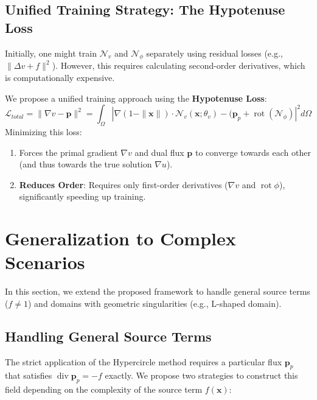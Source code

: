 \documentclass[12pt, a4paper]{article}
\DeclareMathOperator{\rot}{rot}
\DeclareMathOperator{\divg}{div}
\begin{document}
\subsection{Unified Training Strategy: The Hypotenuse Loss}
Initially, one might train $\mathcal{N}_v$ and $\mathcal{N}_\phi$ separately using residual losses (e.g., $\|\Delta v + f\|^2$). However, this requires calculating second-order derivatives, which is computationally expensive.

We propose a unified training approach using the \textbf{Hypotenuse Loss}:
\begin{equation}
    \mathcal{L}_{total} = \| \nabla v - \mathbf{p} \|^2 = \int_{\Omega} | \nabla (1 - \|\mathbf{x}\|) \cdot \mathcal{N}_v(\mathbf{x}; \theta_v) - (\mathbf{p}_p + \rot(\mathcal{N}_\phi) |^2 d\Omega
\end{equation}
Minimizing this loss:
\begin{enumerate}
    \item Forces the primal gradient $\nabla v$ and dual flux $\mathbf{p}$ to converge towards each other (and thus towards the true solution $\nabla u$).
    \item \textbf{Reduces Order}: Requires only first-order derivatives ($\nabla v$ and $\rot \phi$), significantly speeding up training.
\end{enumerate}

\section{Generalization to Complex Scenarios}
In this section, we extend the proposed framework to handle general source terms ($f \neq 1$) and domains with geometric singularities (e.g., L-shaped domain).

\subsection{Handling General Source Terms}
The strict application of the Hypercircle method requires a particular flux $\mathbf{p}_p$ that satisfies $\divg \mathbf{p}_p = -f$ exactly. We propose two strategies to construct this field depending on the complexity of the source term $f(\mathbf{x})$:
\end{document}
